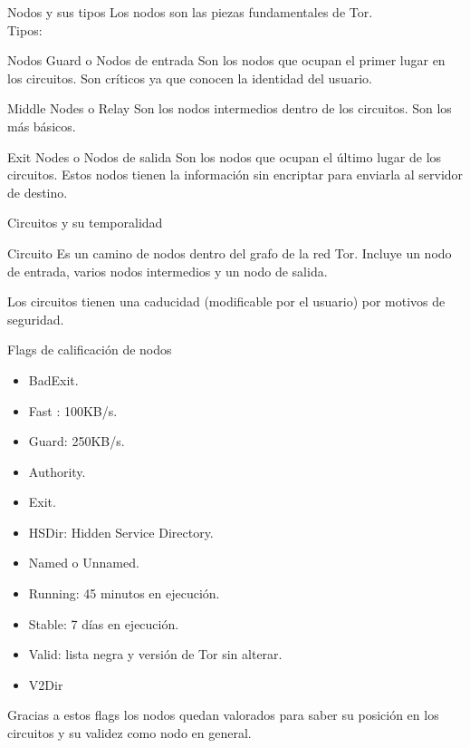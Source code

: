 \documentclass[10pt]{beamer}
\begin{document}
\begin{frame}[fragile]{Nodos y sus tipos}
	\pause
	Los nodos son las piezas fundamentales de Tor.\\
	\pause
	Tipos: \pause
	\begin{block}{Nodos Guard o Nodos de entrada}
		Son los nodos que ocupan el primer lugar en los circuitos. Son críticos ya que conocen la identidad del usuario.
	\end{block}
	\pause
	\begin{block}{Middle Nodes o Relay}
		Son los nodos intermedios dentro de los circuitos. Son los más básicos.
	\end{block}
	\pause
	\begin{block}{Exit Nodes o Nodos de salida}
		Son los nodos que ocupan el último lugar de los circuitos. Estos nodos tienen la información sin encriptar para enviarla al servidor de destino.
	\end{block}
\end{frame}

\begin{frame}[fragile]{Circuitos y su temporalidad}
	\pause
	\begin{block}{Circuito}
		Es un camino de nodos dentro del grafo de la red Tor. Incluye un nodo de entrada, varios nodos intermedios y un nodo de salida.
	\end{block}
	\pause
	Los circuitos tienen una caducidad (modificable por el usuario) por motivos de seguridad.
\end{frame}

\begin{frame}[fragile]{Flags de calificación de nodos}
	\pause
	\begin{itemize}
		\item<1-> BadExit.\pause
		\item<2-> Fast : 100KB/s.\pause
		\item<3-> Guard: 250KB/s. \pause
		\item<4-> Authority.\pause
		\item<5-> Exit.\pause
		\item<6-> HSDir: Hidden Service Directory.\pause
		\item<7-> Named o Unnamed.\pause
		\item<8-> Running: 45 minutos en ejecución.\pause
		\item<9-> Stable: 7 días en ejecución.\pause
		\item<10-> Valid: lista negra y versión de Tor sin alterar.\pause
		\item<11-> V2Dir\pause
	\end{itemize}
	\pause
	Gracias a estos flags los nodos quedan valorados para saber su posición en los circuitos y su validez como nodo en general.
\end{frame}
\end{document}
